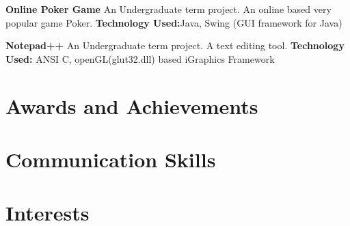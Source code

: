 \documentclass[11pt,a4paper,sans]{moderncv}
\begin{document}
{
\textbf{Online Poker Game}
\newline
An Undergraduate term project. An online based very popular game Poker.
\newline \textbf{Technology Used:}Java, Swing (GUI framework for Java)
\newline
}

{
\textbf{Notepad++}\newline
An Undergraduate term project. A text editing tool.
\newline \textbf{Technology Used:} ANSI C, openGL(glut32.dll) based iGraphics Framework
\newline
}





\section{Awards and Achievements}



\section{Communication Skills}



\section{Interests}

\renewcommand{\listitemsymbol}{-~} %

\end{document}
